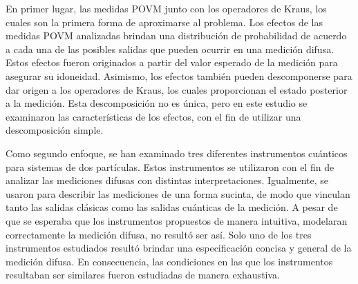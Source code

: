En primer lugar, las medidas POVM junto con los operadores de Kraus, los cuales
son la primera forma de aproximarse al problema. Los efectos de las medidas
POVM  analizadas brindan una distribución de probabilidad de acuerdo a cada una
de las posibles salidas que pueden ocurrir en una medición difusa. Estos
efectos fueron originados a partir del valor esperado de la medición para
asegurar su idoneidad. 
Asimismo, los efectos también pueden descomponerse  para dar origen a los operadores de Kraus, los cuales proporcionan el estado posterior a la medición. Esta descomposición no
es única, pero en este estudio se examinaron las características de los
efectos, con el fin de utilizar una descomposición simple.%



Como segundo enfoque, se han examinado tres diferentes instrumentos
cuánticos para sistemas de dos partículas. Estos instrumentos se utilizaron con
el fin de analizar las mediciones difusas con distintas interpretaciones.
Igualmente, se usaron para describir las mediciones de una forma sucinta, de modo que vinculan tanto las salidas clásicas como las salidas
cuánticas de la medición. A pesar de que se esperaba que los instrumentos
propuestos de manera intuitiva, modelaran correctamente la medición difusa, no resultó ser así. Solo uno de los tres instrumentos estudiados resultó brindar una especificación concisa y general de la medición difusa. En consecuencia, las condiciones en las que los instrumentos resultaban ser similares fueron estudiadas de manera exhaustiva. 





